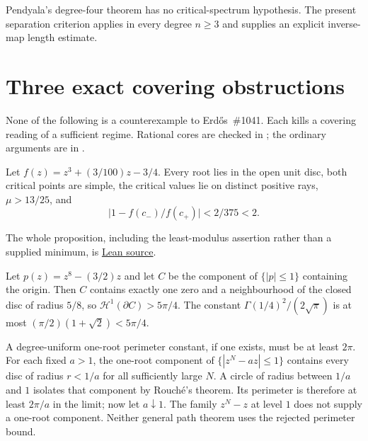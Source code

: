 \documentclass[11pt]{article}
\begin{document}
Pendyala's degree-four theorem \cite[Thm.~1]{june2026} has no
critical-spectrum hypothesis.  The present separation criterion applies in
every degree $n\ge3$ and supplies an explicit inverse-map length estimate.


\section{Three exact covering obstructions}
\label{sec:exact-obstructions}

None of the following is a counterexample to Erd\H{o}s~\#1041.  Each kills a
covering reading of a sufficient regime.  Rational cores are checked in
; the ordinary
arguments are in
.

\begin{proposition}
\label{res:sep-or-false}
Let $f(z)=z^3+(3/100)z-3/4$.  Every root lies in the open unit disc, both
critical points are simple, the critical values lie on distinct positive
rays, $\mu>13/25$, and
\[
 \bigl|1-f(c_-)/f(c_+)\bigr|<2/375<2.
\]
\end{proposition}

\noindent The whole proposition, including the least-modulus assertion rather
than a supplied minimum, is \href{https://github.com/wcook04/plectis-erdos/blob/f36a98bf3d3e6f65f1074e3b800e3293d5b8a51a/ErdosProblems/Erdos1041/PaperSeparationCounterexample.lean#L189}{Lean source}.

\begin{proposition}
\label{res:one-root-gamma-false}
Let $p(z)=z^8-(3/2)z$ and let $C$ be the component of $\{|p|\le1\}$
containing the origin.  Then $C$ contains exactly one zero and a
neighbourhood of the closed disc of radius $5/8$, so
$\mathcal H^1(\partial C)>5\pi/4$.  The constant
$\Gamma(1/4)^2/(2\sqrt{\pi})$ is at most $(\pi/2)(1+\sqrt2)<5\pi/4$.
\end{proposition}

A degree-uniform one-root perimeter constant, if one exists, must be at
least $2\pi$.  For each fixed $a>1$, the one-root component of
$\{|z^N-az|\le1\}$ contains every disc of radius $r<1/a$ for all sufficiently
large $N$.  A circle of radius between $1/a$ and $1$ isolates that component
by Rouch\'e's theorem.  Its perimeter is therefore at least $2\pi/a$ in the
limit; now let $a\downarrow1$.  The family $z^N-z$ at level $1$ does not
supply a one-root component.  Neither general path theorem uses the rejected
perimeter bound.
\end{document}
